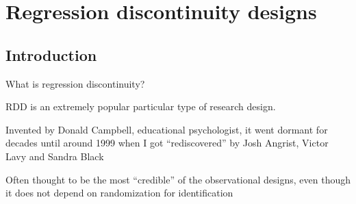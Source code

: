\documentclass{beamer}
\begin{document}



\section{Regression discontinuity designs}

\subsection{Introduction}





\begin{frame}{What is regression discontinuity?}

RDD is an extremely popular particular type of research design.  

\bigskip

Invented by Donald Campbell, educational psychologist, it went dormant for decades until around 1999 when I got ``rediscovered'' by Josh Angrist, Victor Lavy and Sandra Black

\bigskip

Often thought to be the most ``credible'' of the observational designs, even though it does not depend on randomization for identification

\end{frame}



\begin{frame}[plain]

	\begin{figure}
	\end{figure}

\end{frame}
\end{document}
